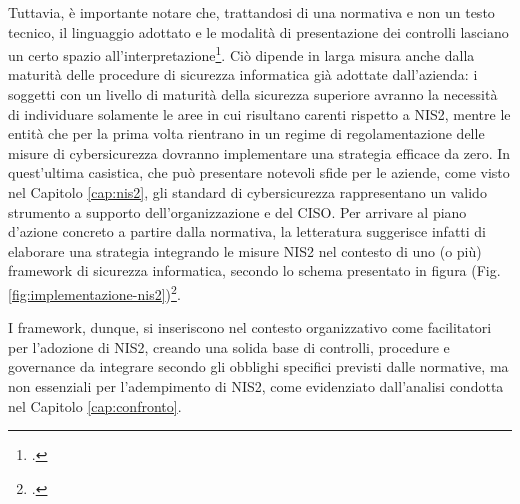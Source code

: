Tuttavia, è importante notare che, trattandosi di una normativa e non un testo tecnico, il linguaggio
adottato e le modalità di presentazione dei controlli lasciano un certo spazio all'interpretazione\footcite[p. 3]{parmar-miles-csf}.
Ciò dipende in larga misura anche dalla maturità delle procedure di sicurezza informatica già adottate dall'azienda: 
i soggetti con un livello di maturità della sicurezza superiore avranno la necessità di individuare solamente 
le aree in cui risultano carenti rispetto a NIS2, mentre le entità che per la prima volta rientrano in un 
regime di regolamentazione delle misure di cybersicurezza dovranno implementare una strategia efficace da zero.
In quest'ultima casistica, che può presentare notevoli sfide per le aziende, come visto nel Capitolo \ref{cap:nis2},
gli standard di cybersicurezza rappresentano un valido strumento a supporto dell'organizzazione e del CISO. 
Per arrivare al piano d'azione concreto a partire dalla normativa, la letteratura suggerisce infatti di elaborare una
strategia integrando le misure NIS2 nel contesto di uno (o più) framework di sicurezza informatica, secondo lo schema
presentato in figura (Fig. \ref{fig:implementazione-nis2})\footcite[p. 5]{parmar-miles-csf}.


I framework, dunque, si inseriscono nel contesto organizzativo come facilitatori per l'adozione di NIS2, creando una solida
base di controlli, procedure e governance da integrare secondo gli obblighi specifici previsti dalle normative,
ma non essenziali per l'adempimento di NIS2, come evidenziato dall'analisi condotta nel Capitolo \ref{cap:confronto}.
